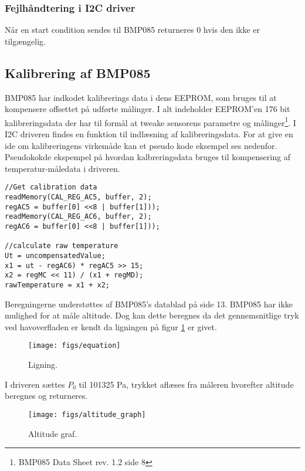\subsubsection{Fejlhåndtering i I2C driver}
Når en start condition sendes til BMP085 returneres 0 hvis den ikke er tilgængelig.

\subsection{Kalibrering af BMP085}
BMP085 har indkodet kalibrerings data i dens EEPROM, som bruges til at kompensere offsettet på udførte målinger. I alt indeholder EEPROM’en 176 bit kalibreringsdata der har til formål at tweake sensorens parametre og målinger\footnote{BMP085 Data Sheet rev. 1.2 side 8}. I I2C driveren findes en funktion til indlæsning af kalibreringsdata.
For at give en ide om kalibreringens virkemåde kan et pseudo kode eksempel ses nedenfor. 
Pseudokokde ekspempel på hvordan kalbreringsdata bruges til kompensering af temperatur-måledata i driveren.

\begin{lstlisting}
//Get calibration data
readMemory(CAL_REG_AC5, buffer, 2);
regAC5 = buffer[0] <<8 | buffer[1]));
readMemory(CAL_REG_AC6, buffer, 2);
regAC6 = buffer[0] <<8 | buffer[1]));

//calculate raw temperature
Ut = uncompensatedValue;
x1 = ut - regAC6) * regAC5 >> 15;
x2 = regMC << 11) / (x1 + regMD);
rawTemperature = x1 + x2;
\end{lstlisting}

Beregningerne understøttes af BMP085’s datablad på side 13.
BMP085 har ikke mulighed for at måle altitude. Dog kan dette beregnes da det gennemsnitlige tryk ved havoverfladen er kendt da ligningen på figur \ref{fig:equation} er givet.

\begin{figure}[h]
	\centering
	\texttt{[image: figs/equation]}
	\caption{Ligning.}
	\label{fig:equation}
\end{figure}

I driveren sættes $P_0$ til 101325 Pa, trykket aflæses fra måleren hvorefter altitude beregnes og returneres. 

\begin{figure}[H]
	\centering
	\texttt{[image: figs/altitude\_graph]}
	\caption{Altitude graf.}
	\label{fig:altitude_graph}
\end{figure}



